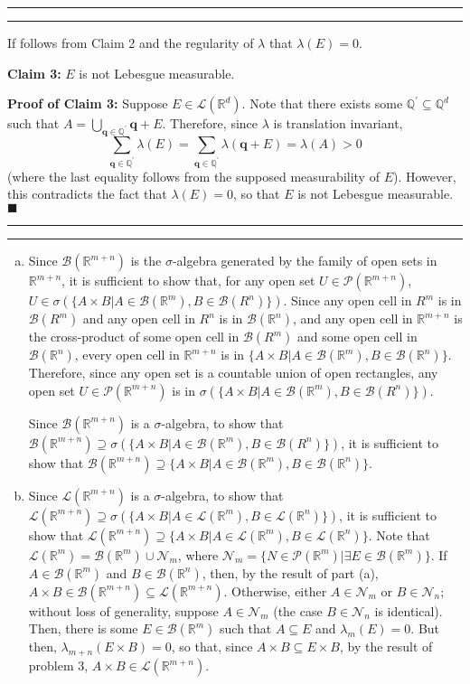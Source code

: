 \documentclass[11pt]{article}
\newcounter{questionCounter}
\newcounter{partCounter}[questionCounter]
\newenvironment{question}[2][\arabic{questionCounter}]{%
    \setcounter{partCounter}{0}%
    \vspace{.25in} \hrule \vspace{0.5em}%
        \noindent{\bf #2}%
    \vspace{0.8em} \hrule \vspace{.10in}%
    \addtocounter{questionCounter}{1}%
}{}
\renewcommand{\qed}{\quad $\blacksquare$}
\newcommand{\bq}{\mathbf{q}}
\newcommand{\Q}{\mathbb{Q}} %
\newcommand{\R}{\mathbb{R}} %
\newcommand{\pow}[1]{\mathcal{P}\left(#1\right)} %
\newcommand{\LRd}{\mathcal{L}\left(\R^d\right)} %
\newcommand{\LR}[1]{\mathcal{L}\left(\R^{#1}\right)} %
\newcommand{\B}{\mathcal{B}} %
\begin{document}
\begin{question}{Problem 3}
If follows from Claim 2 and the regularity of $\lambda$ that $\lambda(E) = 0$.

{\bf Claim 3:} $E$ is not Lebesgue measurable.

{\bf Proof of Claim 3:} Suppose $E \in \LRd$. Note that there exists some
$\Q^{\prime} \subseteq \Q^d$ such that
$A = \bigcup_{\bq \in \Q^{\prime}} \bq + E$. Therefore, since $\lambda$ is
translation invariant,
\[\sum_{\bq \in \Q^{\prime}}\lambda(E)
 = \sum_{\bq \in \Q^{\prime}} \lambda(\bq + E)
 = \lambda(A) > 0\]
(where the last equality follows from the supposed measurability of $E$).
However, this contradicts the fact that $\lambda(E) = 0$, so that $E$ is not
Lebesgue measurable. \qed
\end{question}

\begin{question}{Problem 4}
\begin{enumerate}[(a)]
\item
Since $\B(\R^{m + n})$ is the $\sigma$-algebra generated by the family of open
sets in $\R^{m + n}$, it is sufficient to show that, for any open set
$U \in \pow{\R^{m + n}}$,
$U \in \sigma(\{A \times B | A \in \B(\R^m), B \in \B(R^n)\})$.
Since any open cell in $R^m$ is in $\B(R^m)$ and any open cell in $R^n$ is in
$\B(\R^n)$, and any open cell in $\R^{m + n}$ is the cross-product of some
open cell in $\B(R^m)$ and some open cell in $\B(\R^n)$, every open cell in
$\R^{m + n}$ is in $\{A \times B | A \in \B(\R^m), B \in \B(\R^n)\}$.
Therefore, since any open set is a countable union of open rectangles, any
open set $U \in \pow{\R^{m + n}}$ is in
$\sigma(\{A \times B | A \in \B(\R^m), B \in \B(R^n)\})$.

Since $\B(\R^{m + n})$ is a $\sigma$-algebra, to show that
$\B(\R^{m + n})
 \supseteq \sigma(\{A \times B | A \in \B(\R^m), B \in \B(R^n)\})$, it is
sufficient to show that
$\B(\R^{m + n}) \supseteq \{A \times B | A \in \B(\R^m), B \in \B(\R^n)\}$.

\item Since $\LR{m + n}$ is a $\sigma$-algebra, to show that
$\LR{m + n} \supseteq \sigma(\{A \times B | A \in \LR{m}, B \in \LR{n}\})$, it
is sufficient to show that 
$\LR{m + n} \supseteq \{A \times B | A \in \LR{m}, B \in \LR{n}\}$. Note that
$\LR{m} = \B(\R^m) \cup \mathcal{N}_m$, where
$\mathcal{N}_m = \{N \in \pow{\R^m} | \exists E \in \B(\R^m)\}$. If
$A \in \B(\R^m)$ and $B \in \B(\R^n)$, then, by the result of part (a),
$A \times B \in \B(\R^{m + n}) \subseteq \LR{m + n}$. Otherwise, either
$A \in \mathcal{N}_m$ or $B \in \mathcal{N}_n$; without loss of generality,
suppose $A \in \mathcal{N}_m$ (the case $B \in \mathcal{N}_n$ is identical).
Then, there is some $E \in \B(\R^m)$ such that $A \subseteq E$ and
$\lambda_m(E) = 0$. But then, $\lambda_{m + n}(E \times B) = 0$, so that,
since $A \times B \subseteq E \times B$, by the result of problem 3,
$A \times B \in \LR{m + n}$.


\end{enumerate}
\end{question}
\end{document}
